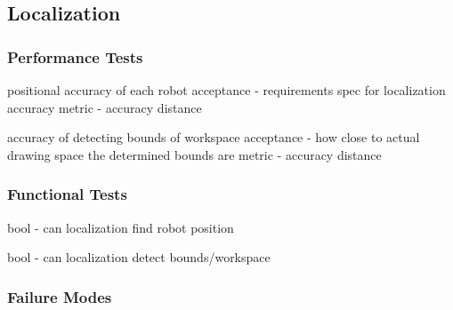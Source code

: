 
\subsection{Localization}
\label{sec:verification_localization}


\subsubsection{Performance Tests}
\label{sec:localization_pt}

positional accuracy of each robot
acceptance - requirements spec for localization accuracy
metric - accuracy distance

accuracy of detecting bounds of workspace
acceptance - how close to actual drawing space the determined bounds are
metric - accuracy distance

\subsubsection{Functional Tests}
\label{sec:localization_ft}

bool - can localization find robot position

bool - can localization detect bounds/workspace 

\subsubsection{Failure Modes}
\label{sec:localization_fm}

